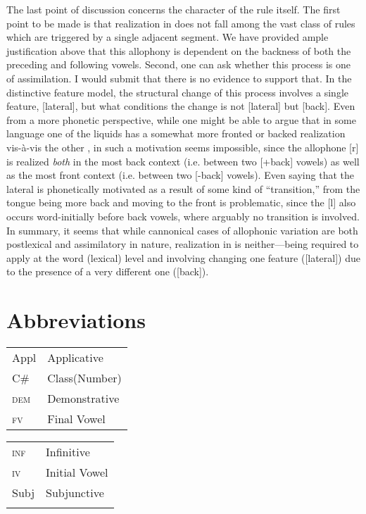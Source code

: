 \documentclass[output=paper
,newtxmath
,modfonts
,nonflat]{langsci/langscibook}
\begin{document}
The last point of discussion concerns the character of the rule itself. The first point to be made is that  realization in  does not fall among the vast class of rules which are triggered by a single adjacent segment. We have provided ample justification above that this allophony is dependent on the backness of both the preceding and following vowels. Second, one can ask whether this process is one of assimilation. I would submit that there is no evidence to support that. In the distinctive feature model, the structural change of this process involves a single feature, [lateral], but what conditions the change is not [lateral] but [back]. Even from a more phonetic perspective, while one might be able to argue that in some language one of the liquids has a somewhat more fronted or backed realization vis-à-vis the other , in  such a motivation seems impossible, since the allophone [r] is realized \textit{both} in the most back context (i.e. between two [+back] vowels) as well as the most front context (i.e. between two [-back] vowels). Even saying that the lateral is phonetically motivated as a result of some kind of “transition,” from the tongue being more back and moving to the front is problematic, since the [l] also occurs word-initially before back vowels, where arguably no transition is involved. In summary, it seems that while cannonical cases of allophonic variation are both postlexical and assimilatory in nature,  realization in  is neither—being required to apply at the word (lexical) level and involving changing one feature ([lateral]) due to the presence of a very different one ([back]).

\section*{Abbreviations}

\begin{tabularx}{.45\textwidth}{lQ}
{Appl} & {Applicative}\\
{C\#} & {Class(Number)}\\
{\textsc{dem}} & {Demonstrative}\\
{\textsc{fv}} & {Final Vowel}\\
\end{tabularx}
\begin{tabularx}{.45\textwidth}{lQ}
{\textsc{inf}} & {Infinitive}\\
\textsc{iv} & {Initial Vowel}\\
{Subj} & {Subjunctive}\\
\\
\end{tabularx}
 

\sloppy
\printbibliography[heading=subbibliography,notkeyword=this]
\end{document}

